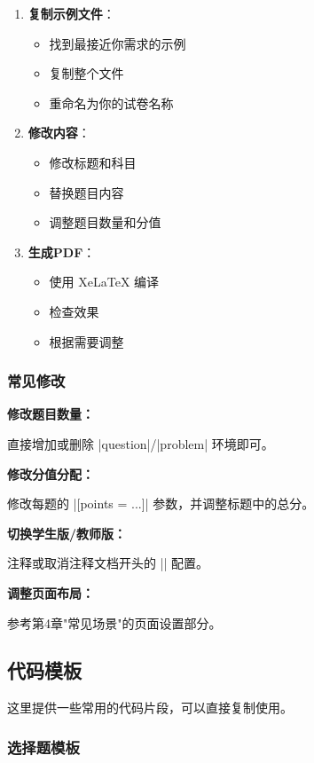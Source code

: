\begin{enumerate}
  \item \textbf{复制示例文件}：
    \begin{itemize}
      \item 找到最接近你需求的示例
      \item 复制整个文件
      \item 重命名为你的试卷名称
    \end{itemize}

  \item \textbf{修改内容}：
    \begin{itemize}
      \item 修改标题和科目
      \item 替换题目内容
      \item 调整题目数量和分值
    \end{itemize}

  \item \textbf{生成PDF}：
    \begin{itemize}
      \item 使用 XeLaTeX 编译
      \item 检查效果
      \item 根据需要调整
    \end{itemize}
\end{enumerate}

\subsubsection{常见修改}

\textbf{修改题目数量：}

直接增加或删除 |question|/|problem| 环境即可。

\textbf{修改分值分配：}

修改每题的 |[points = ...]| 参数，并调整标题中的总分。

\textbf{切换学生版/教师版：}

注释或取消注释文档开头的 |\examsetup| 配置。

\textbf{调整页面布局：}

参考第4章"常见场景"的页面设置部分。

\subsection{代码模板}

这里提供一些常用的代码片段，可以直接复制使用。

\subsubsection{选择题模板}

